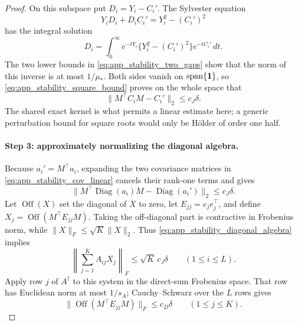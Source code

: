 \begin{proof}
On this subspace put \(D_i=Y_i-C_i'\).  The Sylvester equation
\begin{equation}
 Y_iD_i+D_iC_i'=Y_i^2-(C_i')^2
\end{equation}
has the integral solution
\begin{equation}
 D_i=\int_0^\infty
 e^{-tY_i}\{Y_i^2-(C_i')^2\}e^{-tC_i'}\,dt.
\end{equation}
The two lower bounds in \eqref{eq:app_stability_two_gaps} show that the norm of
this inverse is at most \(1/\mu_*\).  Both sides vanish on
\(\operatorname{span}\{\mathbf{1}\}\), so \eqref{eq:app_stability_square_bound}
proves on the whole space that
\begin{equation}
 \|M^\top C_iM-C_i'\|_2\le c_J\delta.
 \label{eq:app_stability_cov_linear}
\end{equation}
The shared exact kernel is what permits a linear estimate here; a generic
perturbation bound for square roots would only be H\"older of order one half.

\paragraph{Step 3: approximately normalizing the diagonal algebra.}
Because \(a_i'=M^\top a_i\), expanding the two covariance matrices in
\eqref{eq:app_stability_cov_linear} cancels their rank-one terms and gives
\begin{equation}
 \|M^\top\operatorname{Diag}(a_i)M-\operatorname{Diag}(a_i')\|_2
 \le c_J\delta.
 \label{eq:app_stability_diagonal_algebra}
\end{equation}
Let \(\operatorname{Off}(X)\) set the diagonal of \(X\) to zero, let
\(E_{jj}=e_je_j^\top\), and define
\(X_j=\operatorname{Off}(M^\top E_{jj}M)\).  Taking the off-diagonal part is
contractive in Frobenius norm, while
\(\|X\|_F\le\sqrt K\|X\|_2\).  Thus
\eqref{eq:app_stability_diagonal_algebra} implies
\begin{equation}
 \left\|\sum_{j=1}^K A_{ij}X_j\right\|_F
 \le\sqrt K\,c_J\delta
 \qquad(1\le i\le L).
 \label{eq:app_stability_linear_system}
\end{equation}
Apply row \(j\) of \(A^\dagger\) to this system in the direct-sum Frobenius
space.  That row has Euclidean norm at most \(1/s_A\); Cauchy--Schwarz over
the \(L\) rows gives
\begin{equation}
 \|\operatorname{Off}(M^\top E_{jj}M)\|_F
 \le c_D\delta
 \qquad(1\le j\le K).
 \label{eq:app_stability_off_bound}
\end{equation}


\end{proof}
